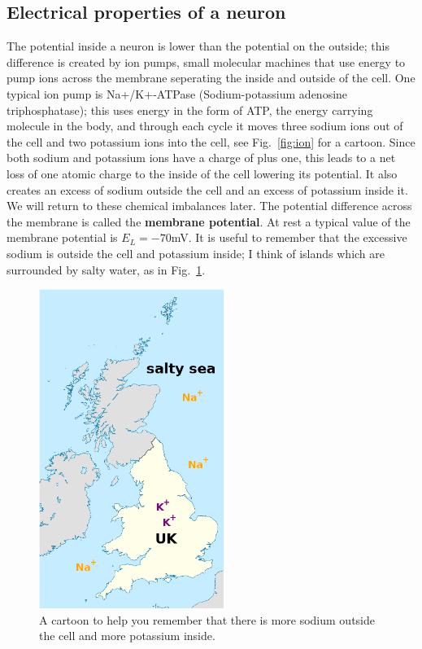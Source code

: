 \documentclass{article}
\begin{document}
\subsection*{Electrical properties of a neuron}
The potential inside a neuron is lower than the potential on the
outside; this difference is created by ion pumps, small molecular
machines that use energy to pump ions across the membrane seperating
the inside and outside of the cell. One typical ion pump is
Na+/K+-ATPase (Sodium-potassium adenosine triphosphatase); this uses
energy in the form of ATP, the energy carrying molecule in the body,
and through each cycle it moves three sodium ions out of the cell and
two potassium ions into the cell, see Fig.~\ref{fig:ion} for a cartoon. Since both sodium and potassium ions
have a charge of plus one, this leads to a net loss of one atomic
charge to the inside of the cell lowering its potential. It also
creates an excess of sodium outside the cell and an excess of
potassium inside it. We will return to these chemical imbalances
later. The potential difference across the membrane is called the
\textbf{membrane potential}. At rest a typical value of the membrane
potential is $E_L=-70 $mV. It is useful to remember that the excessive
sodium is outside the cell and potassium inside; I think of islands
which are surrounded by salty water, as in Fig.~\ref{in_out}.


\begin{figure}
\begin{center}
\includegraphics[width=6cm]{uk.png}
\end{center}
\caption{A cartoon to help you remember that there is more sodium outside the cell and more potassium inside.\label{in_out}}
\end{figure}
\end{document}
